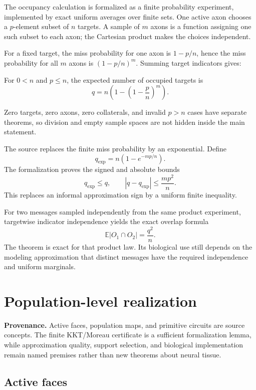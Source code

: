 \documentclass[11pt,a4paper]{article}
\begin{document}
The occupancy calculation is formalized as a finite probability experiment,
implemented by exact uniform averages over finite sets. One active axon
chooses a \(p\)-element subset of \(n\) targets. A sample of \(m\) axons is a
function assigning one such subset to each axon; the Cartesian product makes
the choices independent.

For a fixed target, the miss probability for one axon is \(1-p/n\), hence
the miss probability for all \(m\) axons is \((1-p/n)^m\). Summing target
indicators gives:

\begin{theorem}
For \(0<n\) and \(p\leq n\), the expected number of occupied targets is
\[
  q=n\left(1-\left(1-\frac{p}{n}\right)^m\right).
\]
\end{theorem}

Zero targets, zero axons, zero collaterals, and invalid \(p>n\) cases have
separate theorems, so division and empty sample spaces are not hidden inside
the main statement.

The source replaces the finite miss probability by an exponential. Define
\[
  q_{\exp}=n\left(1-e^{-mp/n}\right).
\]
The formalization proves the signed and absolute bounds
\[
  q_{\exp}\leq q,
  \qquad
  |q-q_{\exp}|\leq\frac{mp^2}{n}.
\]
This replaces an informal approximation sign by a uniform finite inequality.

For two messages sampled independently from the same product experiment,
targetwise indicator independence yields the exact overlap formula
\[
  \mathbb{E}|O_1\cap O_2|=\frac{q^2}{n}.
\]
The theorem is exact for that product law. Its biological use still depends
on the modeling approximation that distinct messages have the required
independence and uniform marginals.

\section{Population-level realization}
\label{sec:population}

\textbf{Provenance.} Active faces, population maps, and primitive circuits are
source concepts. The finite KKT/Moreau certificate is a sufficient
formalization lemma, while approximation quality, support selection, and
biological implementation remain named premises rather than new theorems about
neural tissue.

\subsection{Active faces}
\end{document}

